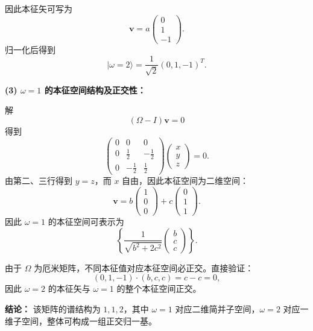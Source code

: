 \begin{solution}[考虑厄米矩阵的本征值与本征空间结构]
因此本征矢可写为
\[
\mathbf{v}=a\begin{pmatrix}0\\1\\-1\end{pmatrix}.
\]
归一化后得到
\[
|\omega=2\rangle=\frac{1}{\sqrt{2}}(0,1,-1)^T.
\]

\vspace{0.5em}
\textbf{(3) $\omega=1$ 的本征空间结构及正交性：}

解
\[
(\Omega-I)\mathbf{v}=0
\]
得到
\[
\begin{pmatrix}
0&0&0\\
0&\frac{1}{2}&-\frac{1}{2}\\
0&-\frac{1}{2}&\frac{1}{2}
\end{pmatrix}
\begin{pmatrix}x\\y\\z\end{pmatrix}=0.
\]
由第二、三行得到 $y=z$，而 $x$ 自由，因此本征空间为二维空间：
\[
\mathbf{v}=b\begin{pmatrix}1\\0\\0\end{pmatrix}
+c\begin{pmatrix}0\\1\\1\end{pmatrix}.
\]
因此 $\omega=1$ 的本征空间可表示为
\[
\left\{\frac{1}{\sqrt{b^2+2c^2}}
\begin{pmatrix}
b\\c\\c
\end{pmatrix}\right\}.
\]

由于 $\Omega$ 为厄米矩阵，不同本征值对应本征空间必正交。直接验证：
\[
(0,1,-1)\cdot(b,c,c)=c-c=0,
\]
因此 $\omega=2$ 的本征矢与 $\omega=1$ 的整个本征空间正交。

\vspace{0.3em}
\textbf{结论：}
该矩阵的谱结构为 $1,1,2$，其中 $\omega=1$ 对应二维简并子空间，$\omega=2$ 对应一维子空间，整体可构成一组正交归一基。
\end{solution}

